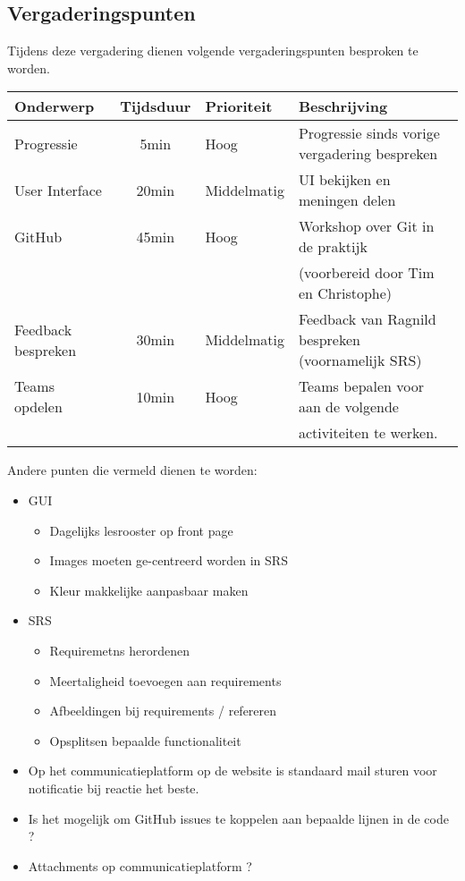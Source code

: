 \subsection{Vergaderingspunten}
Tijdens deze vergadering dienen volgende vergaderingspunten besproken te worden.
\begin{table} [H]
	\centering
	\begin{tabular} {l|cll}
		\textbf{Onderwerp} & \textbf{Tijdsduur} & \textbf{Prioriteit} & \textbf{Beschrijving} \\ %
		\hline
		Progressie & 5min & Hoog & Progressie sinds vorige vergadering bespreken \\
		User Interface & 20min & Middelmatig & UI bekijken en meningen delen \\
		GitHub	& 45min & Hoog & Workshop over Git in de praktijk \\
				& 		& 		& (voorbereid door Tim en Christophe) \\
		Feedback bespreken & 30min & Middelmatig & Feedback van Ragnild bespreken (voornamelijk SRS) \\
		Teams opdelen & 10min & Hoog & Teams bepalen voor aan de volgende \\
						& 		&  & activiteiten te werken.
	\end{tabular}
\end{table}

Andere punten die vermeld dienen te worden:
\begin{itemize}
	\item GUI \begin{itemize}
				\item Dagelijks lesrooster op front page
				\item Images moeten ge-centreerd worden in SRS
				\item Kleur makkelijke aanpasbaar maken
			  \end{itemize}
	\item SRS \begin{itemize}
				\item Requiremetns herordenen
				\item Meertaligheid toevoegen aan requirements
				\item Afbeeldingen bij requirements / refereren
				\item Opsplitsen bepaalde functionaliteit
		 	  \end{itemize}	
\end{itemize}
\begin{itemize}
	\item Op het communicatieplatform op de website is standaard mail sturen voor notificatie bij reactie het beste.
	\item Is het mogelijk om GitHub issues te koppelen aan bepaalde lijnen in de code ?
	\item Attachments op communicatieplatform ?
\end{itemize}

